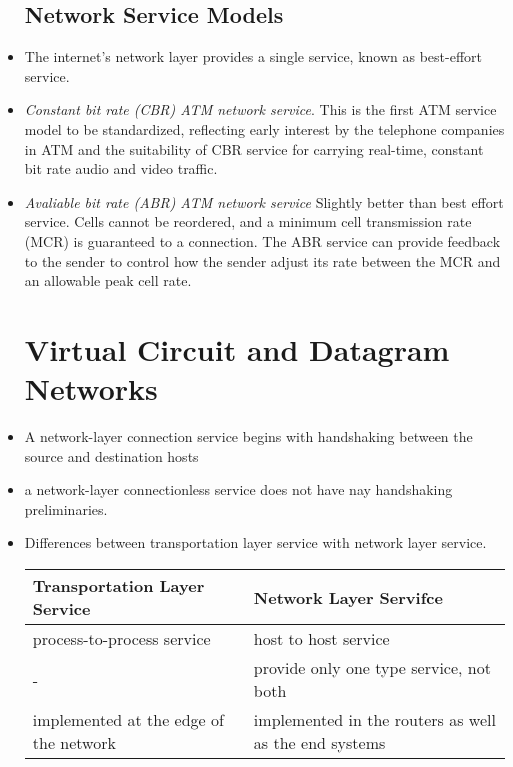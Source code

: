 \documentclass{article}
\begin{document}
\begin{itemize}
\subsection{Network Service Models}
\item The internet's network layer provides a single service, known as
  best-effort service.
\item \emph{Constant bit rate (CBR) ATM network service}. This is the
    first ATM service model to be standardized, reflecting early
    interest by the telephone companies in ATM and the suitability of
    CBR service for carrying real-time, constant bit rate audio and
    video traffic.
\item \emph{Avaliable bit rate (ABR) ATM network service} Slightly
  better than best effort service. Cells cannot be reordered, and a
  minimum cell transmission rate (MCR) is guaranteed to a
  connection. The ABR service can provide feedback to the sender to
  control how the sender adjust its rate between the MCR and an
  allowable peak cell rate.
\section{Virtual Circuit and Datagram Networks}
\item A network-layer connection service begins with handshaking
  between the source and destination hosts
\item a network-layer connectionless service does not have nay
  handshaking preliminaries.
\item Differences between transportation layer service with network
  layer service. 
\begin{center}
\begin{tabular}{|p{5cm}|p{5cm}|}
  \hline
  Transportation Layer Service & Network Layer Servifce \\ \hline
  process-to-process service   & host to host service \\ \hline
  -                            & provide only one type service, not
  both \\ \hline
  implemented at the edge of the network
                               & implemented in the routers as well as
                               the end systems \\ \hline
  
\end{tabular}
\end{center}

\end{itemize}
\end{document}
